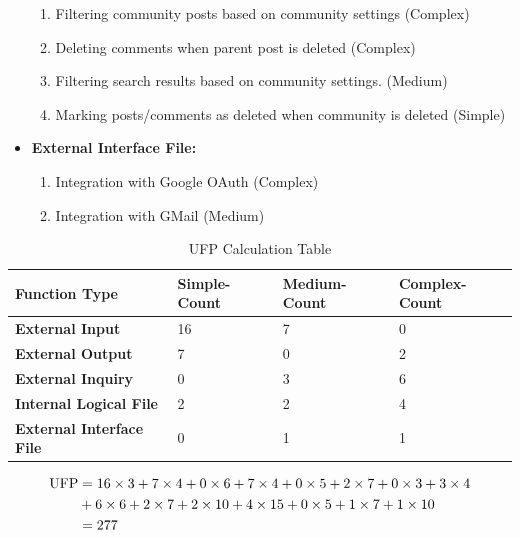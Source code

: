 \documentclass[11pt]{article}
\begin{document}
\begin{itemize}
\begin{enumerate}
              \item Filtering community posts based on community settings (Complex)
              \item Deleting comments when parent post is deleted (Complex)
              \item Filtering search results based on community settings. (Medium)
              \item Marking posts/comments as deleted when community is deleted (Simple)
          \end{enumerate}
    \item \textbf{External Interface File:}
          \begin{enumerate}
              \item Integration with Google OAuth (Complex)
              \item Integration with GMail (Medium)
          \end{enumerate}
\end{itemize}

\begin{table}[H]
    \centering
    \begin{tabular}{|p{3.2cm}|p{3.2cm}|p{3.2cm}|p{3.2cm}|}
        \hline
        \textbf{Function Type}           & \textbf{Simple-Count} & \textbf{Medium-Count} & \textbf{Complex-Count} \\\hline
        \textbf{External Input}          & 16                    & 7                     & 0                      \\\hline
        \textbf{External Output}         & 7                     & 0                     & 2                      \\\hline
        \textbf{External Inquiry}        & 0                     & 3                     & 6                      \\\hline
        \textbf{Internal Logical File}   & 2                     & 2                     & 4                      \\\hline
        \textbf{External Interface File} & 0                     & 1                     & 1                      \\\hline
    \end{tabular}
    \caption{UFP Calculation Table}
\end{table}
\begin{align}
    \text{UFP} & = 16\times3 + 7\times4 + 0\times6 + 7\times4 + 0\times5 + 2\times7 + 0\times3 + 3\times4 \\\notag &+6\times6 + 2\times7 + 2\times10 + 4\times15 + 0\times5 + 1\times7+ 1\times10\\
               & = 277
\end{align}
\end{document}
